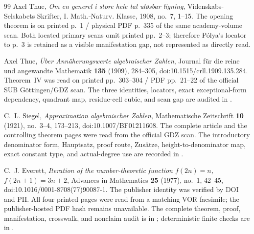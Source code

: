 \begin{thebibliography}{99}
Axel Thue,
\emph{Om en generel i store hele tal ul{\o}sbar ligning},
Videnskabs-Selskabets Skrifter, I. Math.-Naturv. Klasse, 1908, no.~7,
1--15.  The opening theorem is on printed p.~1 / physical PDF p.~335 of the
same academy-volume scan.  Both located primary scans omit printed pp.~2--3;
therefore P\'olya's locator to p.~3 is retained as a visible manifestation
gap, not represented as directly read.

Axel Thue,
\emph{\"Uber Ann\"aherungswerte algebraischer Zahlen},
Journal f\"ur die reine und angewandte Mathematik \textbf{135} (1909),
284--305, doi:10.1515/crll.1909.135.284.  Theorem~IV was read on printed
pp.~303--304 / PDF pp.~21--22 of the official SUB G\"ottingen/GDZ scan.  The
three identities, locators, exact exceptional-form dependency, quadrant map,
residue-cell cubic, and scan gap are audited in
.

C.~L. Siegel,
\emph{Approximation algebraischer Zahlen},
Mathematische Zeitschrift \textbf{10} (1921), no.~3--4, 173--213,
doi:10.1007/BF01211608.  The complete article and the controlling theorem
pages were read from the official GDZ scan.  The introductory denominator
form, Hauptsatz, proof route, Zus\"atze, height-to-denominator map, exact
constant type, and actual-degree use are recorded in
.

C.~J. Everett,
\emph{Iteration of the number-theoretic function
$f(2n)=n$, $f(2n+1)=3n+2$},
Advances in Mathematics \textbf{25} (1977), no.~1, 42--45,
doi:10.1016/0001-8708(77)90087-1.  The publisher identity was verified by
DOI and PII.  All four printed pages were read from a matching VOR facsimile;
the publisher-hosted PDF hash remains unavailable.  The complete theorem,
proof, manifestation, crosswalk, and nonclaim audit is in
; deterministic finite checks are
in .


\end{thebibliography}

